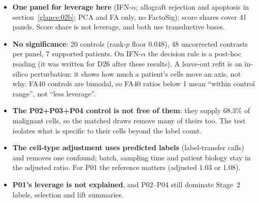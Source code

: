 
\begin{caveatbox}
\begin{itemize}
\item \textbf{One panel for leverage here} (IFN-$\alpha$; allograft rejection and apoptosis in section~\ref{glance:02b}; PCA and FA only, no FactoSig); score shares cover 41 panels. Score share is not leverage, and both use transductive bases.
\item \textbf{No significance}: 20 controls (rank-$p$ floor 0.048), 48 uncorrected contrasts per panel, 7 supported patients. On IFN-$\alpha$ the decision rule is a post-hoc reading (it was written for D26 after these results). A leave-out refit is an in-silico perturbation: it shows how much a patient's cells move an axis, not why. FA40 controls are bimodal, so FA40 ratios below 1 mean ``within control range'', not ``less leverage''.
\item \textbf{The P02+P03+P04 control is not free of them}: they supply 68.3\% of malignant cells, so the matched draws remove many of theirs too. The test isolates what is specific to their cells beyond the label count.
\item \textbf{The cell-type adjustment uses predicted labels} (label-transfer calls) and removes one confound; batch, sampling time and patient biology stay in the adjusted ratio. For P01 the reference matters (adjusted 1.03 or 1.08).
\item \textbf{P01's leverage is not explained}, and P02--P04 still dominate Stage~2 labels, selection and lift summaries.
\end{itemize}
\end{caveatbox}

